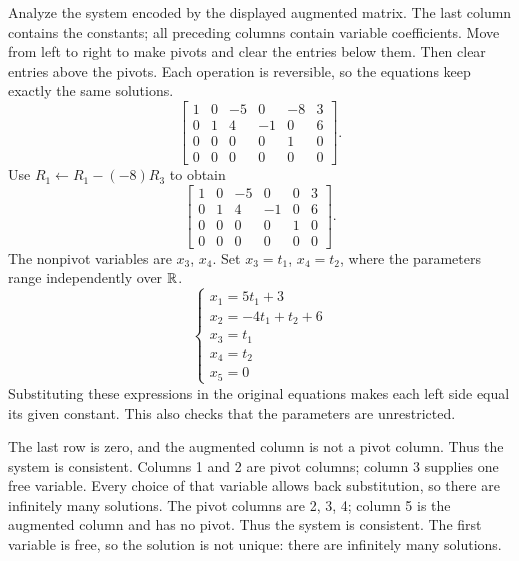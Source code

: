 \goal Analyze the system encoded by the displayed augmented matrix. The last column contains the constants; all preceding columns contain variable coefficients.
\idea Move from left to right to make pivots and clear the entries below them. Then clear entries above the pivots. Each operation is reversible, so the equations keep exactly the same solutions.
\[ \left[\begin{array}{rrrrr|r}1&0&-5&0&-8&3\\0&1&4&-1&0&6\\0&0&0&0&1&0\\0&0&0&0&0&0\end{array}\right].\]
Use $R_{1}\leftarrow R_{1}-(-8)R_{3}$ to obtain
\[ \left[\begin{array}{rrrrr|r}1&0&-5&0&0&3\\0&1&4&-1&0&6\\0&0&0&0&1&0\\0&0&0&0&0&0\end{array}\right].\]
The nonpivot variables are $x_{3}$, $x_{4}$. Set $x_{3}=t_{1}$, $x_{4}=t_{2}$, where the parameters range independently over $\mathbb{R}$.
\[ \begin{cases}x_{1}=5 t_{1} + 3\\x_{2}=- 4 t_{1} + t_{2} + 6\\x_{3}=t_{1}\\x_{4}=t_{2}\\x_{5}=0\end{cases}\]
Substituting these expressions in the original equations makes each left side equal its given constant. This also checks that the parameters are unrestricted.

The last row is zero, and the augmented column is not a pivot column.
Thus the system is consistent. Columns 1 and 2 are pivot columns;
column 3 supplies one free variable. Every choice of that variable
allows back substitution, so there are infinitely many solutions.
The pivot columns are 2, 3, 4; column 5 is the augmented column and
has no pivot. Thus the system is consistent. The first variable is free,
so the solution is not unique: there are infinitely many solutions.

